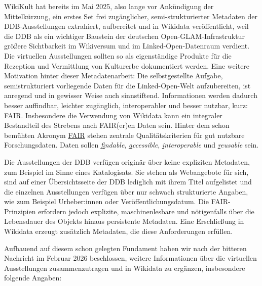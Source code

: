 \documentclass[a4paper,
fontsize=11pt,
oneside,
numbers=noperiodatend,
parskip=half-,
bibliography=totoc,
final
]{scrartcl}
\begin{document}
WikiKult hat bereits im Mai 2025, also lange vor Ankündigung der
Mittelkürzung, ein erstes Set frei zugänglicher, semi-strukturierter
Metadaten der DDB-Ausstellungen extrahiert, aufbereitet und in Wikidata
veröffentlicht, weil die DDB als ein wichtiger Baustein der deutschen
Open-GLAM-Infrastruktur größere Sichtbarkeit im Wikiversum und im
Linked-Open-Datenraum verdient. Die virtuellen Ausstellungen sollten so
als eigenständige Produkte für die Rezeption und Vermittlung von
Kulturerbe dokumentiert werden. Eine weitere Motivation hinter dieser
Metadatenarbeit: Die selbstgestellte Aufgabe, semistrukturiert
vorliegende Daten für die Linked-Open-Welt aufzubereiten, ist anregend
und in gewisser Weise auch sinnstiftend. Informationen werden dadurch
besser auffindbar, leichter zugänglich, interoperabler und besser
nutzbar, kurz: FAIR. Insbesondere die Verwendung von Wikidata kann ein
integraler Bestandteil des Strebens nach FAIR(er)en Daten sein. Hinter
dem schon bemühten Akronym
\href{https://www.go-fair.org/fair-principles/a2-metadata-accessible-even-data-no-longer-available/}{FAIR}
stehen zentrale Qualitätskriterien für gut nutzbare Forschungsdaten.
Daten sollen \emph{\underline{f}indable}, \emph{\underline{a}ccessible},
\emph{\underline{i}nteroperable} und \emph{\underline{r}eusable} sein.

Die Ausstellungen der DDB verfügen originär über keine expliziten
Metadaten, zum Beispiel im Sinne eines Katalogisats. Sie stehen als
Webangebote für sich, sind auf einer Übersichtsseite der DDB lediglich
mit ihrem Titel aufgelistet und die einzelnen Ausstellungen verfügen
über nur schwach strukturierte Angaben, wie zum Beispiel Urheber:innen
oder Veröffentlichungsdatum. Die FAIR-Prinzipien erfordern jedoch
explizite, maschinenlesbare und nötigenfalls über die Lebensdauer des
Objekts hinaus persistente Metadaten. Eine Erschließung in Wikidata
erzeugt zusätzlich Metadaten, die diese Anforderungen erfüllen.

Aufbauend auf diesem schon gelegten Fundament haben wir nach der
bitteren Nachricht im Februar 2026 beschlossen, weitere Informationen
über die virtuellen Ausstellungen zusammenzutragen und in Wikidata zu
ergänzen, insbesondere folgende Angaben:

\newcommand{\wdlink}[2]{\href{https://www.wikidata.org/wiki/#1}{(#2)}}
\end{document}
